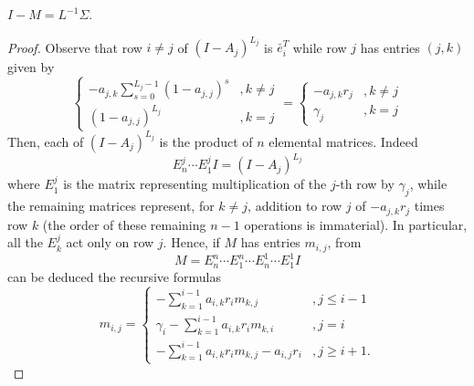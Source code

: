 \documentclass[10pt,a4paper]{amsart}
\begin{document}
\begin{theorem}
$I-M=L^{-1}\Sigma$.
\end{theorem}

\begin{proof}
Observe that row $i\neq j$ of $(I-A_j)^{L_j}$ is $\bar{e}_i^{T}$ while row $j$ has entries $(j,k)$ given by
\[
\begin{cases}
-a_{j,k}\sum_{s=0}^{L_j-1}(1-a_{j,j})^s& ,k\neq j\\
(1-a_{j,j})^{L_j}& ,k=j
\end{cases}=
\begin{cases}
-a_{j,k}r_j& ,k\neq j\\
\gamma_j & ,k=j
\end{cases}
\]
Then, each of $(I-A_j)^{L_j}$ is the product of $n$ elemental matrices. Indeed
\[
E^{j}_n\cdots E^{j}_1 I=(I-A_j)^{L_j}
\]
where $E^{j}_1$ is the matrix representing multiplication of the $j$-th row by $\gamma_j$, while the remaining matrices represent, for $k\neq j$, addition to row $j$ of $-a_{j,k}r_j$ times row $k$ (the order of these remaining $n-1$ operations is immaterial). In particular, all the $E^j_k$ act only on row $j$. 
Hence, if $M$ has entries $m_{i,j}$, from 
\[
M=E^{n}_n\cdots E^{n}_1 \cdots E^{1}_n\cdots E^{1}_1 I
\]
can be deduced the recursive formulas
\[
m_{i,j}=\begin{cases}
-\sum_{k=1}^{i-1}a_{i,k}r_im_{k,j} & , j\leq i-1 \\
\gamma_i -\sum_{k=1}^{i-1}a_{i,k}r_im_{k,i} &, j=i\\
-\sum_{k=1}^{i-1}a_{i,k}r_im_{k,j} -a_{i,j}r_i  &, j\geq i+1.
\end{cases}
\]


\end{proof}
\end{document}
